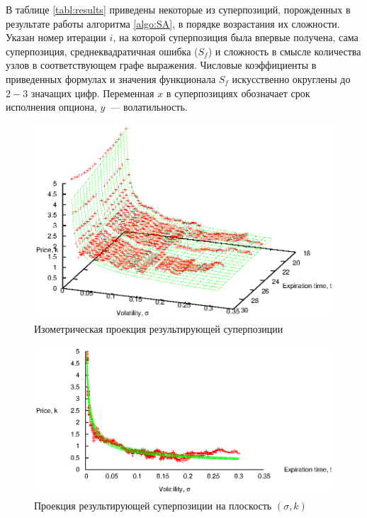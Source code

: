 \documentclass[12pt,a4paper]{article}
\begin{document}
В таблице \ref{tabl:results} приведены некоторые из суперпозиций,
порожденных в результате работы алгоритма \ref{algo:SA}, в порядке возрастания
их сложности. Указан номер итерации $i$, на которой суперпозиция была впервые
получена, сама суперпозиция, среднеквадратичная ошибка ($S_f$) и сложность в
смысле количества узлов в соответствующем графе выражения. Числовые коэффициенты
в приведенных формулах и значения функционала $S_f$ искусственно округлены до
$2-3$ значащих цифр. Переменная $x$ в суперпозициях обозначает срок исполнения
опциона, $y$~--- волатильность.


\begin{figure}[h]
  \centering
  \includegraphics[scale=1.1]{figs/1-iso.eps}
  \caption{Изометрическая проекция результирующей суперпозиции}
  \label{fig:1_iso}
\end{figure}

\begin{figure}[h]
  \centering
  \includegraphics[scale=1.1]{figs/1-proj.eps}
  \caption{Проекция результирующей суперпозиции на плоскость $(\sigma, k)$}
  \label{fig:1_proj}
\end{figure}
\end{document}
